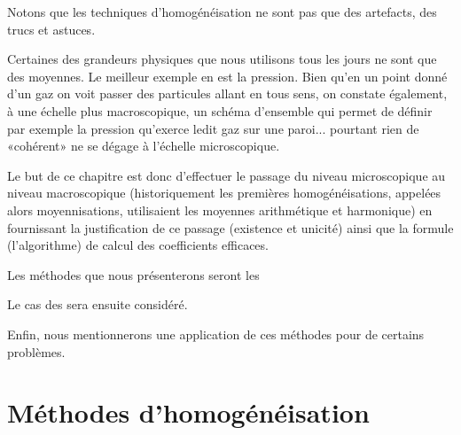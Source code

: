 \medskip{}
Notons que les techniques d'homogénéisation ne sont pas que des artefacts, des trucs et astuces.

Certaines des grandeurs physiques que nous utilisons tous les jours ne sont que des moyennes. Le meilleur exemple en est la pression. Bien qu'en un point donné d'un gaz on voit passer des particules allant en tous sens, on constate également, à une échelle plus macroscopique, un schéma d'ensemble qui permet de définir par exemple la pression qu'exerce ledit gaz sur une paroi... pourtant rien de «cohérent» ne se dégage à l'échelle microscopique.

\medskip
Le but de ce chapitre est donc d'effectuer le passage du niveau microscopique au niveau macroscopique (historiquement les premières homogénéisations, appelées alors moyennisations, utilisaient les moyennes arithmétique et harmonique) en fournissant la justification de ce passage (existence et unicité) ainsi que la formule (l'algorithme) de calcul des coefficients efficaces.

\medskip
Les méthodes que nous présenterons seront les 

Le cas des  sera ensuite considéré.

Enfin, nous mentionnerons une application de ces méthodes pour  de certains problèmes.


\medskip
\section{Méthodes d'homogénéisation}

